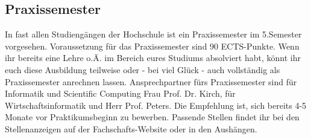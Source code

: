 \subsection{Praxissemester}
In fast allen Studiengängen der Hochschule ist ein Praxissemester im 
5.Semester vorgesehen. Voraussetzung für das Praxissemester sind 
90 ECTS-Punkte. Wenn ihr bereits eine Lehre o.Ä. im Bereich eures 
Studiums absolviert habt, könnt ihr euch diese Ausbildung teilweise oder - bei viel Glück - auch vollständig als
Praxissemester anrechnen lassen. Ansprechpartner fürs Praxissemester 
sind für Informatik und Scientific Computing Frau Prof. Dr. Kirch, für 
Wirtschaftsinformatik und Herr Prof. Peters.\doublebreak
Die Empfehlung ist, sich bereits 4-5 Monate vor Praktikumsbeginn zu 
bewerben. Passende Stellen findet ihr bei den Stellenanzeigen auf der 
Fachschafts-Website oder in den Aushängen.